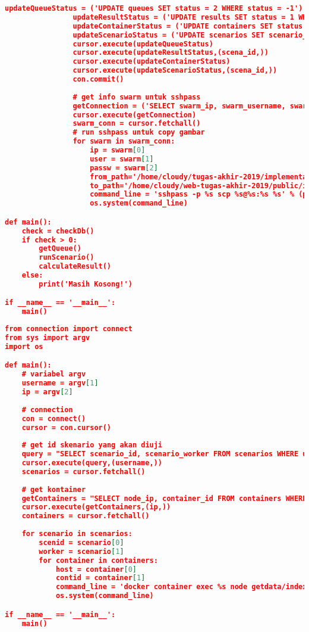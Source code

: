 \begin{lstlisting}[frame=single,tabsize=2,breaklines,caption={Isi berkas queue.py},label=queuepy, captionpos=b, language=json]
				updateQueueStatus = ('UPDATE queues SET status = 2 WHERE status = -1')
				updateResultStatus = ('UPDATE results SET status = 1 WHERE scenario_id = %s')
				updateContainerStatus = ('UPDATE containers SET status = 0, username = 0 WHERE status = 1')
				updateScenarioStatus = ('UPDATE scenarios SET scenario_status = 2 WHERE scenario_id = %s')
				cursor.execute(updateQueueStatus)
				cursor.execute(updateResultStatus,(scena_id,))
				cursor.execute(updateContainerStatus)
				cursor.execute(updateScenarioStatus,(scena_id,))
				con.commit()
				
				# get info swarm untuk sshpass
				getConnection = ('SELECT swarm_ip, swarm_username, swarm_password FROM swarms WHERE is_used = 1')
				cursor.execute(getConnection)
				swarm_conn = cursor.fetchall()
				# run sshpass untuk copy gambar
				for swarm in swarm_conn:
					ip = swarm[0]
					user = swarm[1]
					passw = swarm[2]
					from_path='/home/cloudy/tugas-akhir-2019/implementasi/output/ss'+scena_id+'.png'
					to_path='/home/cloudy/web-tugas-akhir-2019/public/images/'
					command_line = 'sshpass -p %s scp %s@%s:%s %s' % (passw, user, ip, from_path, to_path)
					os.system(command_line)

def main():
	check = checkDb()
	if check > 0:
		getQueue()
		runScenario()
		calculateResult()
	else:
		print('Masih Kosong!')

if __name__ == '__main__':
	main()
\end{lstlisting}

\begin{lstlisting}[frame=single,tabsize=2,breaklines,caption={Isi berkas run\_scenario.py},label=runscenpy, captionpos=b, language=json]
from connection import connect
from sys import argv
import os

def main():
	# variabel argv
	username = argv[1]
	ip = argv[2]
	
	# connection
	con = connect()
	cursor = con.cursor()
	
	# get id skenario yang akan diuji
	query = "SELECT scenario_id, scenario_worker FROM scenarios WHERE username = %s AND scenario_status = 1"
	cursor.execute(query,(username,))
	scenarios = cursor.fetchall()
	
	# get kontainer
	getContainers = "SELECT node_ip, container_id FROM containers WHERE node_ip = %s AND status = 1"
	cursor.execute(getContainers,(ip,))
	containers = cursor.fetchall()
	
	for scenario in scenarios:
		scenid = scenario[0]
		worker = scenario[1]
		for container in containers:
			host = container[0]
			contid = container[1]
			command_line = 'docker container exec %s node getdata/index.js %s %s %s %s' % (contid, scenid, contid, worker, host)
			os.system(command_line)

if __name__ == '__main__':
	main()
\end{lstlisting}

